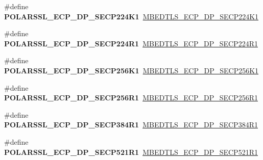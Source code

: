 \begin{DoxyCompactItemize}
\item 
\mbox{\label{compat-1_83_8h_afeed429a4d1763c977e7f85afb559791}} 
\#define {\bfseries P\+O\+L\+A\+R\+S\+S\+L\+\_\+\+E\+C\+P\+\_\+\+D\+P\+\_\+\+S\+E\+C\+P224\+K1}~\mbox{\hyperlink{ecp_8h_af79e530ea8f8416480f805baa20b1a2dabae9bc9de43957062495162e603c0943}{M\+B\+E\+D\+T\+L\+S\+\_\+\+E\+C\+P\+\_\+\+D\+P\+\_\+\+S\+E\+C\+P224\+K1}}
\item 
\mbox{\label{compat-1_83_8h_a64e835ef7af96291f5a7a0f8a64d36f1}} 
\#define {\bfseries P\+O\+L\+A\+R\+S\+S\+L\+\_\+\+E\+C\+P\+\_\+\+D\+P\+\_\+\+S\+E\+C\+P224\+R1}~\mbox{\hyperlink{ecp_8h_af79e530ea8f8416480f805baa20b1a2da89c8d4502fa02eecd44f8de4831b38c8}{M\+B\+E\+D\+T\+L\+S\+\_\+\+E\+C\+P\+\_\+\+D\+P\+\_\+\+S\+E\+C\+P224\+R1}}
\item 
\mbox{\label{compat-1_83_8h_a19d87918b65e013991efedfc3d089d6f}} 
\#define {\bfseries P\+O\+L\+A\+R\+S\+S\+L\+\_\+\+E\+C\+P\+\_\+\+D\+P\+\_\+\+S\+E\+C\+P256\+K1}~\mbox{\hyperlink{ecp_8h_af79e530ea8f8416480f805baa20b1a2da6de9f87d43d7c29c7f91e9986ccfc25f}{M\+B\+E\+D\+T\+L\+S\+\_\+\+E\+C\+P\+\_\+\+D\+P\+\_\+\+S\+E\+C\+P256\+K1}}
\item 
\mbox{\label{compat-1_83_8h_a14c3a9d71568ba446b529b67a1c57ce5}} 
\#define {\bfseries P\+O\+L\+A\+R\+S\+S\+L\+\_\+\+E\+C\+P\+\_\+\+D\+P\+\_\+\+S\+E\+C\+P256\+R1}~\mbox{\hyperlink{ecp_8h_af79e530ea8f8416480f805baa20b1a2daf73bbf7b29d26a0bc77dcff47cd6b276}{M\+B\+E\+D\+T\+L\+S\+\_\+\+E\+C\+P\+\_\+\+D\+P\+\_\+\+S\+E\+C\+P256\+R1}}
\item 
\mbox{\label{compat-1_83_8h_aa9b2118a6d61de8ce2842afaff5abef3}} 
\#define {\bfseries P\+O\+L\+A\+R\+S\+S\+L\+\_\+\+E\+C\+P\+\_\+\+D\+P\+\_\+\+S\+E\+C\+P384\+R1}~\mbox{\hyperlink{ecp_8h_af79e530ea8f8416480f805baa20b1a2da08d0615820297b8c90f8ec7cbd88f641}{M\+B\+E\+D\+T\+L\+S\+\_\+\+E\+C\+P\+\_\+\+D\+P\+\_\+\+S\+E\+C\+P384\+R1}}
\item 
\mbox{\label{compat-1_83_8h_a7b441d81baa207e1ca5dcf9bd78aa38f}} 
\#define {\bfseries P\+O\+L\+A\+R\+S\+S\+L\+\_\+\+E\+C\+P\+\_\+\+D\+P\+\_\+\+S\+E\+C\+P521\+R1}~\mbox{\hyperlink{ecp_8h_af79e530ea8f8416480f805baa20b1a2daaa2d9d42df56aab024ef760ee9dffca2}{M\+B\+E\+D\+T\+L\+S\+\_\+\+E\+C\+P\+\_\+\+D\+P\+\_\+\+S\+E\+C\+P521\+R1}}

\end{DoxyCompactItemize}
